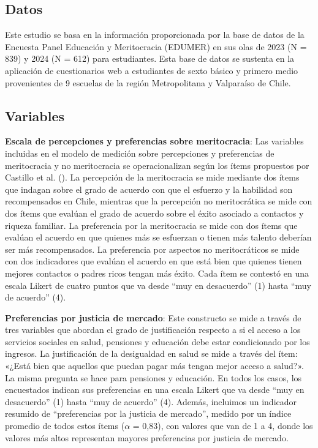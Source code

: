 \documentclass[
  12pt,
  letterpaper,
]{article}
\begin{document}
\subsection{Datos}\label{datos}

Este estudio se basa en la información proporcionada por la base de
datos de la Encuesta Panel Educación y Meritocracia (EDUMER) en sus olas
de 2023 (N = 839) y 2024 (N = 612) para estudiantes. Esta base de datos
se sustenta en la aplicación de cuestionarios web a estudiantes de sexto
básico y primero medio provenientes de 9 escuelas de la región
Metropolitana y Valparaíso de Chile.

\subsection{Variables}\label{variables}

\textbf{Escala de percepciones y preferencias sobre meritocracia}: Las
variables incluidas en el modelo de medición sobre percepciones y
preferencias de meritocracia y no meritocracia se operacionalizan según
los ítems propuestos por Castillo et al.
(). La percepción de
la meritocracia se mide mediante dos ítems que indagan sobre el grado de
acuerdo con que el esfuerzo y la habilidad son recompensados en Chile,
mientras que la percepción no meritocrática se mide con dos ítems que
evalúan el grado de acuerdo sobre el éxito asociado a contactos y
riqueza familiar. La preferencia por la meritocracia se mide con dos
ítems que evalúan el acuerdo en que quienes más se esfuerzan o tienen
más talento deberían ser más recompensados. La preferencia por aspectos
no meritocráticos se mide con dos indicadores que evalúan el acuerdo en
que está bien que quienes tienen mejores contactos o padres ricos tengan
más éxito. Cada ítem se contestó en una escala Likert de cuatro puntos
que va desde ``muy en desacuerdo'' (1) hasta ``muy de acuerdo'' (4).

\textbf{Preferencias por justicia de mercado}: Este constructo se mide a
través de tres variables que abordan el grado de justificación respecto
a si el acceso a los servicios sociales en salud, pensiones y educación
debe estar condicionado por los ingresos. La justificación de la
desigualdad en salud se mide a través del ítem: «¿Está bien que aquellos
que puedan pagar más tengan mejor acceso a salud?». La misma pregunta se
hace para pensiones y educación. En todos los casos, los encuestados
indican sus preferencias en una escala Likert que va desde ``muy en
desacuerdo'' (1) hasta ``muy de acuerdo'' (4). Además, incluimos un
indicador resumido de ``preferencias por la justicia de mercado'',
medido por un índice promedio de todos estos ítems (\(\alpha\) = 0,83),
con valores que van de 1 a 4, donde los valores más altos representan
mayores preferencias por justicia de mercado.
\end{document}
